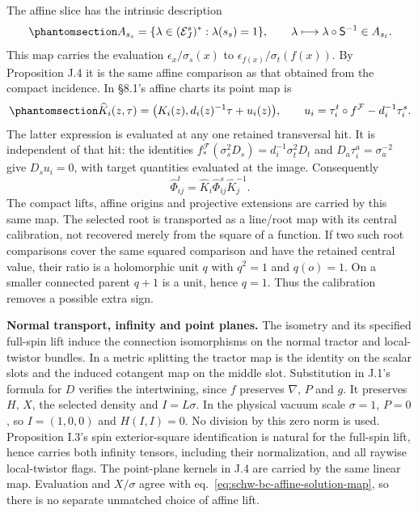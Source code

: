 \documentclass[
  english,
  11pt,
  reqno]{amsart}
\begin{document}
The affine slice has the intrinsic description
\begin{equation}\protect\phantomsection\label{eq:schw-bc-affine-solution-map}{
 A_{s_s}=\{\lambda\in(\mathcal E_J^s)^*: \lambda(s_s)=1\},
 \qquad
 \lambda\longmapsto\lambda\circ\mathsf S^{-1}\in A_{s_t}.
}\end{equation} This map carries the evaluation
\(\epsilon_x/\sigma_s(x)\) to \(\epsilon_{f(x)}/\sigma_t(f(x))\). By
Proposition J.4 it is the same affine comparison as that obtained from
the compact incidence. In §8.1's affine charts its point map is
\begin{equation}\protect\phantomsection\label{eq:schw-bc-affine-chart-map}{
 \widehat K_i(z,\tau)
  =\bigl(K_i(z),d_i(z)^{-1}\tau+u_i(z)\bigr),\qquad
 u_i=\tau_i^t\circ f^{\mathcal F}-d_i^{-1}\tau_i^s.
}\end{equation} The latter expression is evaluated at any one retained
transversal hit. It is independent of that hit: the identities
\(f^{\mathcal F}_*(\sigma_s^2D_s)=d_i^{-1}\sigma_t^2D_t\) and
\(D_a\tau_i^a=\sigma_a^{-2}\) give \(D_su_i=0\), with target quantities
evaluated at the image. Consequently \[
 \widehat\Phi^t_{ij}
 =\widehat K_i\widehat\Phi^s_{ij}\widehat K_j^{-1}.
\] The compact lifts, affine origins and projective extensions are
carried by this same map. The selected root is transported as a
line/root map with its central calibration, not recovered merely from
the square of a function. If two such root comparisons cover the same
squared comparison and have the retained central value, their ratio is a
holomorphic unit \(q\) with \(q^2=1\) and \(q(o)=1\). On a smaller
connected parent \(q+1\) is a unit, hence \(q=1\). Thus the calibration
removes a possible extra sign.

\textbf{Normal transport, infinity and point planes.} The isometry and
its specified full-spin lift induce the connection isomorphisms on the
normal tractor and local-twistor bundles. In a metric splitting the
tractor map is the identity on the scalar slots and the induced
cotangent map on the middle slot. Substitution in J.1's formula for
\(D\) verifies the intertwining, since \(f\) preserves \(\nabla\), \(P\)
and \(g\). It preserves \(H\), \(X\), the selected density and
\(I=L\sigma\). In the physical vacuum scale \(\sigma=1\), \(P=0\), so
\(I=(1,0,0)\) and \(H(I,I)=0\). No division by this zero norm is used.
Proposition I.3's spin exterior-square identification is natural for the
full-spin lift, hence carries both infinity tensors, including their
normalization, and all raywise local-twistor flags. The point-plane
kernels in J.4 are carried by the same linear map. Evaluation and
\(X/\sigma\) agree with eq.~\ref{eq:schw-bc-affine-solution-map}, so
there is no separate unmatched choice of affine lift.
\end{document}
